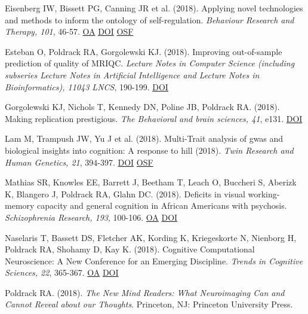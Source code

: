 \documentclass[10pt, letterpaper]{article}
\begin{document}
Eisenberg IW, Bissett PG, Canning JR et al. (2018). Applying novel technologies and methods to inform the ontology of self-regulation. \textit{Behaviour Research and Therapy, 101}, 46-57. \href{https://www.ncbi.nlm.nih.gov/pmc/articles/PMC5801197}{OA} \href{https://doi.org/10.1016/j.brat.2017.09.014}{DOI} \href{https://osf.io/amxpv/}{OSF} \vspace{2mm}

Esteban O, Poldrack RA, Gorgolewski KJ.  (2018). Improving out-of-sample prediction of quality of MRIQC. \textit{Lecture Notes in Computer Science (including subseries Lecture Notes in Artificial Intelligence and Lecture Notes in Bioinformatics), 11043 LNCS}, 190-199. \href{https://doi.org/10.1007/978-3-030-01364-6_21}{DOI} \vspace{2mm}

Gorgolewski KJ, Nichols T, Kennedy DN, Poline JB, Poldrack RA.  (2018). Making replication prestigious. \textit{The Behavioral and brain sciences, 41}, e131. \href{https://doi.org/10.1017/s0140525x18000663}{DOI} \vspace{2mm}

Lam M, Trampush JW, Yu J et al. (2018). Multi-Trait analysis of gwas and biological insights into cognition: A response to hill (2018). \textit{Twin Research and Human Genetics, 21}, 394-397. \href{https://doi.org/10.1017/thg.2018.46}{DOI} \href{https://osf.io/t5kzx/}{OSF} \vspace{2mm}

Mathias SR, Knowles EE, Barrett J, Beetham T, Leach O, Buccheri S, Aberizk K, Blangero J, Poldrack RA, Glahn DC.  (2018). Deficits in visual working-memory capacity and general cognition in African Americans with psychosis. \textit{Schizophrenia Research, 193}, 100-106. \href{https://www.ncbi.nlm.nih.gov/pmc/articles/PMC5825248}{OA} \href{https://doi.org/10.1016/j.schres.2017.08.015}{DOI} \vspace{2mm}

Naselaris T, Bassett DS, Fletcher AK, Kording K, Kriegeskorte N, Nienborg H, Poldrack RA, Shohamy D, Kay K.  (2018). Cognitive Computational Neuroscience: A New Conference for an Emerging Discipline. \textit{Trends in Cognitive Sciences, 22}, 365-367. \href{https://www.ncbi.nlm.nih.gov/pmc/articles/PMC5911192}{OA} \href{https://doi.org/10.1016/j.tics.2018.02.008}{DOI} \vspace{2mm}

Poldrack RA.  (2018).  \textit{The New Mind Readers: What Neuroimaging Can and Cannot Reveal about our Thoughts}. Princeton, NJ: Princeton University Press.\vspace{2mm}
\end{document}
